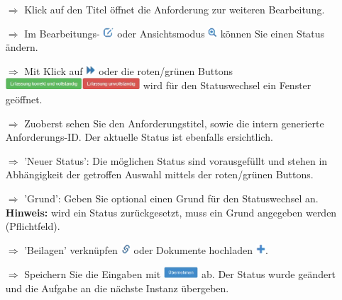 \documentclass{article}
\begin{document}
\begin{multicols}{2}
\begin{tcolorbox}[colback=blue!5,colframe=blue!40!black,title={Anforderungen managen}]
\begin{itemize}
  \item[$\Longrightarrow$] Klick auf den Titel öffnet die Anforderung zur weiteren Bearbeitung.
\end{itemize}
\end{tcolorbox}

\end{multicols}


\begin{multicols}{2}

\begin{tcolorbox}[colback=blue!5,colframe=blue!40!black,title=Status ändern]
\begin{itemize}
	\item[$\Longrightarrow$] Im Bearbeitungs- \includegraphics[height=10pt]{Icons/Bearbeiten.png} oder Ansichtsmodus \includegraphics[height=10pt]{Icons/Lupe.png} können Sie einen Status ändern. 
	\item[$\Longrightarrow$] Mit Klick auf \includegraphics[height=10pt]{Icons/Status_aendern.png} oder die roten/grünen Buttons \includegraphics[height=12pt]{Icons/r-g_Button.jpg} wird für den Statuswechsel ein Fenster geöffnet.
	\item[$\Longrightarrow$] Zuoberst sehen Sie den Anforderungstitel, sowie die intern generierte Anforderungs-ID. Der aktuelle Status ist ebenfalls ersichtlich.
  \item[$\Longrightarrow$] 'Neuer Status': Die möglichen Status sind vorausgefüllt und stehen in Abhängigkeit der getroffen Auswahl mittels der roten/grünen Buttons.
  \item[$\Longrightarrow$] 'Grund': Geben Sie optional einen Grund für den Statuswechsel an. \textbf{Hinweis:} wird ein Status zurückgesetzt, muss ein Grund angegeben werden (Pflichtfeld).
  \item[$\Longrightarrow$] 'Beilagen' verknüpfen \includegraphics[height=10pt]{Icons/Link.png} oder Dokumente hochladen \includegraphics[height=10pt]{Icons/Pluszeichen.png}.
	\item[$\Longrightarrow$] Speichern Sie die Eingaben mit \includegraphics[height=12pt]{Icons/B_Uebernehmen.jpg} ab. Der Status wurde geändert und die Aufgabe an die nächste Instanz übergeben.


\end{itemize}
\end{tcolorbox}
\end{multicols}
\end{document}
